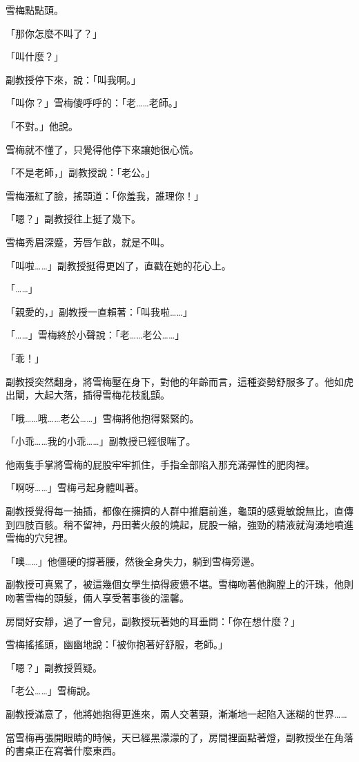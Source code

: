 雪梅點點頭。

「那你怎麼不叫了？」

「叫什麼？」

副教授停下來，說：「叫我啊。」

「叫你？」雪梅傻呼呼的：「老……老師。」

「不對。」他說。

雪梅就不懂了，只覺得他停下來讓她很心慌。

「不是老師，」副教授說：「老公。」

雪梅漲紅了臉，搖頭道：「你羞我，誰理你！」

「嗯？」副教授往上挺了幾下。

雪梅秀眉深蹙，芳唇乍啟，就是不叫。

「叫啦……」副教授挺得更凶了，直戳在她的花心上。

「……」

「親愛的，」副教授一直賴著：「叫我啦……」

「……」雪梅終於小聲說：「老……老公……」

「乖！」

副教授突然翻身，將雪梅壓在身下，對他的年齡而言，這種姿勢舒服多了。他如虎出閘，大起大落，插得雪梅花枝亂顫。

「哦……哦……老公……」雪梅將他抱得緊緊的。

「小乖……我的小乖……」副教授已經很喘了。

他兩隻手掌將雪梅的屁股牢牢抓住，手指全部陷入那充滿彈性的肥肉裡。

「啊呀……」雪梅弓起身體叫著。

副教授覺得每一抽插，都像在擁擠的人群中推磨前進，龜頭的感覺敏銳無比，直傳到四肢百骸。稍不留神，丹田著火般的燒起，屁股一縮，強勁的精液就洶湧地噴進雪梅的穴兒裡。

「噢……」他僵硬的撐著腰，然後全身失力，躺到雪梅旁邊。

副教授可真累了，被這幾個女學生搞得疲憊不堪。雪梅吻著他胸膛上的汗珠，他則吻著雪梅的頭髮，倆人享受著事後的溫馨。

房間好安靜，過了一會兒，副教授玩著她的耳垂問：「你在想什麼？」

雪梅搖搖頭，幽幽地說：「被你抱著好舒服，老師。」

「嗯？」副教授質疑。

「老公……」雪梅說。

副教授滿意了，他將她抱得更進來，兩人交著頸，漸漸地一起陷入迷糊的世界……

當雪梅再張開眼睛的時候，天已經黑濛濛的了，房間裡面點著燈，副教授坐在角落的書桌正在寫著什麼東西。

